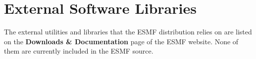 
\section{External Software Libraries}
\label{sec:lib}

The external utilities and libraries that the ESMF 
distribution relies on are listed on the {\bf Downloads \&
Documentation} page of the ESMF website.  None of them are 
currently included in the ESMF source.





